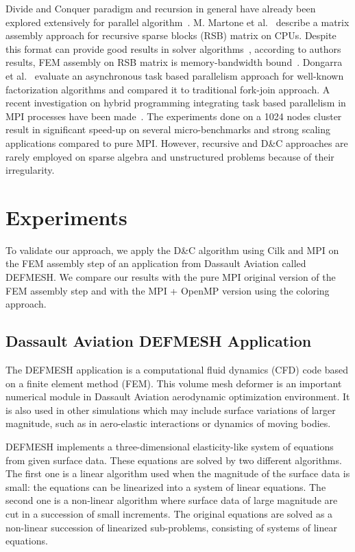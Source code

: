 \documentclass[10pt]{IOS-Book-Article}
\begin{document}
Divide and Conquer paradigm and recursion in general have already been explored extensively for parallel algorithm~\cite{div}.
M. Martone et al.~\cite{RSBasm} describe a matrix assembly approach for recursive sparse blocks (RSB) matrix on CPUs.
Despite this format can provide good results in solver algorithms~\cite{RSBsolver}, according to authors results, FEM assembly on RSB matrix is memory-bandwidth bound~\cite{RSBasm}.
Dongarra et al.~\cite{Dongarra} evaluate an asynchronous task based parallelism approach for well-known factorization algorithms and compared it to traditional fork-join approach.
A recent investigation on hybrid programming integrating task based parallelism in MPI processes have been made~\cite{MPI_task}.
The experiments done on a 1024 nodes cluster result in significant speed-up on several micro-benchmarks and strong scaling applications compared to pure MPI.
However, recursive and D\&C approaches are rarely employed on sparse algebra and unstructured problems because of their irregularity.

\section{Experiments}
To validate our approach, we apply the D\&C algorithm using Cilk and MPI on the FEM assembly step of an application from Dassault Aviation called DEFMESH.
We compare our results with the pure MPI original version of the FEM assembly step and with the MPI + OpenMP version using the coloring approach.

\subsection{Dassault Aviation DEFMESH Application}
The DEFMESH application is a computational fluid dynamics (CFD) code based on a finite element method (FEM).
This volume mesh deformer is an important numerical module in Dassault Aviation aerodynamic optimization environment.
It is also used in other simulations which may include surface variations of larger magnitude, such as in aero-elastic interactions or dynamics of moving bodies.

DEFMESH implements a three-dimensional elasticity-like system of equations from given surface data.
These equations are solved by two different algorithms.
The first one is a linear algorithm used when the magnitude of the surface data is small: the equations can be linearized into a system of linear equations.
The second one is a non-linear algorithm where surface data of large magnitude are cut in a succession of small increments.
The original equations are solved as a non-linear succession of linearized sub-problems, consisting of systems of linear equations.
 
\end{document}
